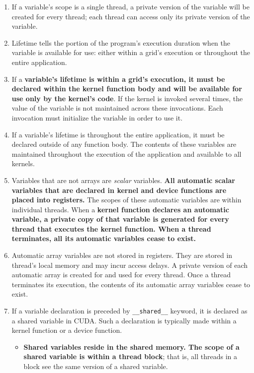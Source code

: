 \begin{enumerate}
    \item If a variable's scope is a single thread, a private version of the variable will be created for every thread; each thread can access only its private version of the variable.
    \item Lifetime tells the portion of the program's execution duration when the variable is available for use: either within a grid's execution or throughout the entire application.
    \item If a \textbf{variable's lifetime is within a grid's execution, it must be declared within the kernel function body and will be available for use only by the kernel's code}. If the kernel is invoked several times, the value of the variable is not maintained across these invocations. Each invocation must initialize the variable in order to use it.
    \item If a variable's lifetime is throughout the entire application, it must be declared outside of any function body. The contents of these variables are maintained throughout the execution of the application and available to all kernels.
    \item Variables that are not arrays are \textsl{scalar} variables. \textbf{All automatic scalar variables that are declared in kernel and device functions are placed into registers.} The scopes of these automatic variables are within individual threads. When a \textbf{kernel function declares an automatic variable, a private copy of that variable is generated for every thread that executes the kernel function. When a thread terminates, all its automatic variables cease to exist.}
    \item Automatic array variables are not stored in registers. They are stored in thread's local memory and may incur access delays. A private version of each automatic array is created for and used for every thread. Once a thread terminates its execution, the contents of its automatic array variables cease to exist.
    \item If a variable declaration is preceded by \texttt{\_\_shared\_\_} keyword, it is declared as a shared variable in CUDA. Such a declaration is typically made within a kernel function or a device function.
          \begin{itemize}
              \item \textbf{Shared variables reside in the shared memory. The scope of a shared variable is within a thread block}; that is, all threads in a block see the same version of a shared variable.

\end{itemize}
\end{enumerate}
